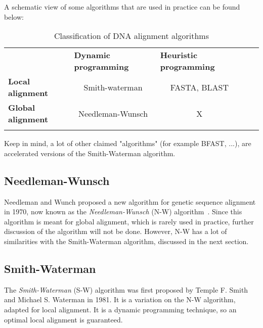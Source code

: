 A schematic view of some algorithms that are used in practice can be found below:

\begin{table}[H]
	\begin{tabular}{lllll}
		\cline{1-3}
		\multicolumn{1}{|l|}{}                          & \multicolumn{1}{l|}{\textbf{Dynamic programming}} & \multicolumn{1}{l|}{\textbf{Heuristic programming}} &  &  \\ \cline{1-3}
		\multicolumn{1}{|l|}{\textbf{Local alignment}}  & \multicolumn{1}{c|}{Smith-waterman}               & \multicolumn{1}{c|}{FASTA, BLAST}                   &  &  \\ \cline{1-3}
		\multicolumn{1}{|l|}{\textbf{Global alignment}} & \multicolumn{1}{c|}{Needleman-Wunsch}             & \multicolumn{1}{c|}{X}                              &  &  \\ \cline{1-3}
		&                                                   &                                                     &  & 
	\end{tabular}
	\caption{Classification of DNA alignment algorithms}
\end{table}


Keep in mind, a lot of other claimed "algorithms" (for example BFAST, ...), are accelerated versions of the Smith-Waterman algorithm.

\subsection{Needleman-Wunsch}
Needleman and Wunch proposed a new algorithm for genetic sequence alignment in 1970, now known as the \emph{Needleman-Wunsch} (N-W) algorithm~\cite{NW}. Since this algorithm is meant for global alignment, which is rarely used in practice, further discussion of the algorithm will not be done. However, N-W has a lot of similarities with the Smith-Waterman algorithm, discussed in the next section.

\subsection{Smith-Waterman}
\label{expl:SWanalyse}
The \emph{Smith-Waterman} (S-W) algorithm was first proposed by Temple F. Smith and Michael S. Waterman in 1981\cite{SW}. It is a variation on the N-W algorithm, adapted for local alignment. It is a dynamic programming technique, so an optimal local alignment is guaranteed. \\

